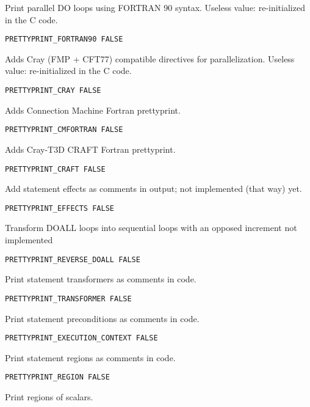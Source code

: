 Print parallel DO loops using FORTRAN 90 syntax. Useless value:
re-initialized in the C code.

\begin{verbatim}
PRETTYPRINT_FORTRAN90 FALSE
\end{verbatim}

Adds Cray (FMP + CFT77) compatible directives for parallelization.
Useless value: re-initialized in the C code.

\begin{verbatim}
PRETTYPRINT_CRAY FALSE
\end{verbatim}

Adds Connection Machine Fortran prettyprint.

\begin{verbatim}
PRETTYPRINT_CMFORTRAN FALSE
\end{verbatim}

Adds Cray-T3D CRAFT Fortran prettyprint.

\begin{verbatim}
PRETTYPRINT_CRAFT FALSE
\end{verbatim}

Add statement effects as comments in output; not implemented (that way) yet.

\begin{verbatim}
PRETTYPRINT_EFFECTS FALSE
\end{verbatim}

Transform DOALL loops into sequential loops with an opposed increment
not implemented

\begin{verbatim}
PRETTYPRINT_REVERSE_DOALL FALSE
\end{verbatim}

Print statement transformers as comments in code.

\begin{verbatim}
PRETTYPRINT_TRANSFORMER FALSE
\end{verbatim}

Print statement preconditions as comments in code.

\begin{verbatim}
PRETTYPRINT_EXECUTION_CONTEXT FALSE
\end{verbatim}

Print statement regions as comments in code.

\begin{verbatim}
PRETTYPRINT_REGION FALSE
\end{verbatim}

Print regions of scalars.

